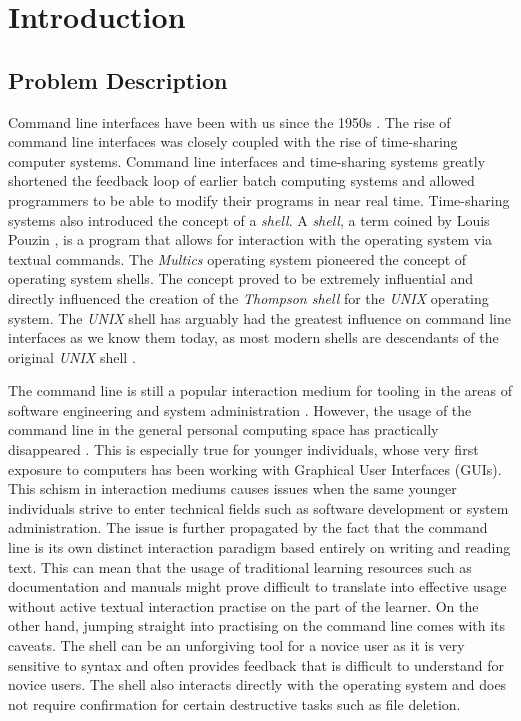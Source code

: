 \chapter{Introduction}
\label{chap:intro}

\section{Problem Description}

Command line interfaces have been with us since the 1950s
\cite{raymond2004art}. The rise of command line interfaces was closely coupled
with the rise of time-sharing computer systems. Command line interfaces and
time-sharing systems greatly shortened the feedback loop of earlier batch
computing systems and allowed programmers to be able to modify their programs
in near real time. Time-sharing systems also introduced the concept of a
\textit{shell}. A \textit{shell}, a term coined by Louis Pouzin \cite{pouzin},
is a program that allows for interaction with the operating system via textual
commands\cite{mashey1976using}. The \textit{Multics}\cite{corbato1965introduction} operating system
pioneered the concept of operating system shells. The concept proved to be
extremely influential and directly influenced the creation of the
\textit{Thompson shell} for the \textit{UNIX} \cite{ritchie1974unix} operating
system. The \textit{UNIX} shell has arguably had the greatest influence on
command line interfaces as we know them today, as most modern shells are
descendants of the original \textit{UNIX} shell \cite{raymond2004art}.

The command line is still a popular interaction medium for tooling in the areas
of software engineering and system administration
\cite{hultstrand2015git, takayama2006trust}. However, the usage of the command
line in the general personal computing space has practically disappeared
\cite{reimer2005history}. This is especially true for younger individuals,
whose very first exposure to computers has been working with Graphical User
Interfaces (GUIs). This schism in interaction mediums causes issues when the
same younger individuals strive to enter technical fields such as software
development or system administration. The issue is further propagated by the
fact that the command line is its own distinct interaction paradigm based
entirely on writing and reading text. This can mean that the usage of
traditional learning resources such as documentation and manuals might prove
difficult to translate into effective usage without active textual interaction
practise on the part of the learner. On the other hand, jumping straight into
practising on the command line comes with its caveats. The shell can be an
unforgiving tool for a novice user as it is very sensitive to syntax and often
provides feedback that is difficult to understand for novice users. The shell
also interacts directly with the operating system and does not require
confirmation for certain destructive tasks such as file deletion.

